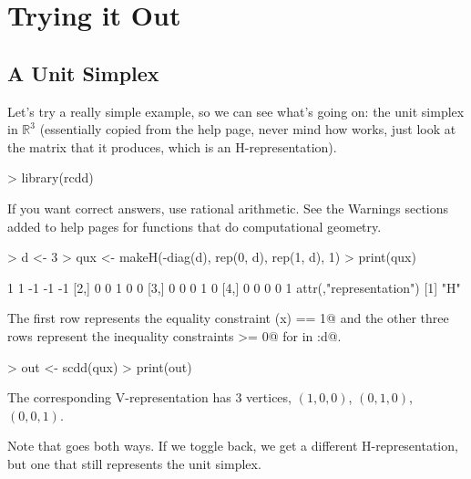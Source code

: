 \documentclass{article}
\newcommand{\real}{\mathbb{R}}
\begin{document}
\section{Trying it Out}

\subsection{A Unit Simplex}

Let's try a really simple example, so we can see what's going on:
the unit simplex in $\real^3$ (essentially copied from the \verb@scdd@
help page, never mind how \verb@makeH@ works, just look at the matrix
\verb@qux@ that it produces, which is an H-representation).
\begin{Schunk}
\begin{Sinput}
> library(rcdd)
\end{Sinput}
\begin{Soutput}
If you want correct answers, use rational arithmetic.
See the Warnings sections added to help pages for
    functions that do computational geometry.
\end{Soutput}
\begin{Sinput}
> d <- 3
> qux <- makeH(-diag(d), rep(0, d), rep(1, d), 1)
> print(qux)
\end{Sinput}
\begin{Soutput}
     [,1] [,2] [,3] [,4] [,5]
[1,]    1    1   -1   -1   -1
[2,]    0    0    1    0    0
[3,]    0    0    0    1    0
[4,]    0    0    0    0    1
attr(,"representation")
[1] "H"
\end{Soutput}
\end{Schunk}
The first row represents the equality constraint \verb@sum(x) == 1@
and the other three rows represent the inequality constraints \verb@x[i] >= 0@
for \verb@i@ in :d@.
\begin{Schunk}
\begin{Sinput}
> out <- scdd(qux)
> print(out)
\end{Sinput}
\end{Schunk}
The corresponding V-representation has 3 vertices,
$(1, 0, 0)$, $(0, 1, 0)$, $(0, 0, 1)$.
\begin{Schunk}
\end{Schunk}
Note that \verb@scdd@ goes both ways.  If we toggle back,
we get a different H-representation, but one that still
represents the unit simplex.
\end{document}
